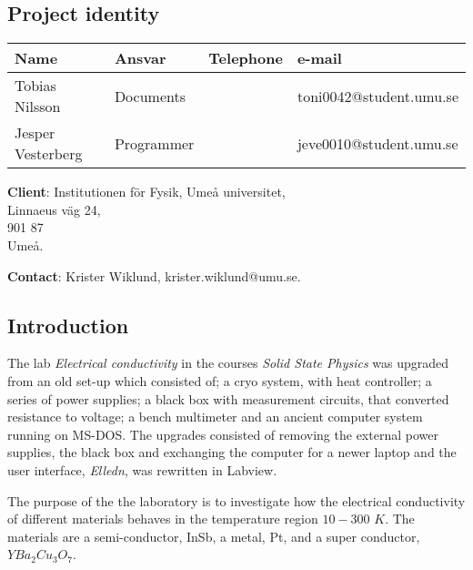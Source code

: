 \documentclass[a4paper,12pt]{article}
\begin{document}
\pagestyle{fancy}
\headheight 35pt 
\rhead{\small\today \\ }
\chead{\projektnamn}
\lhead{\organisation \\ }
\cfoot{\thepage}
\rfoot{\projektgrupp}
\begin{center}

\section*{\center Project identity}

\bigskip
\begin{tabular}{|p{35mm}|p{30mm}|p{20mm}|p{45mm}|}
\hline
\textbf{Name} & \textbf{Ansvar} & \textbf{Telephone} & \textbf{e-mail}\\
\hline
Tobias Nilsson & Documents &  & toni0042@student.umu.se\\
\hline
Jesper Vesterberg & Programmer &  & jeve0010@student.umu.se\\
\hline
\end{tabular}

\bigskip
\textbf{Client}: Institutionen för Fysik, Umeå universitet, \\
Linnaeus väg 24,\\
901 87\\
Umeå.

\textbf{Contact}: Krister Wiklund, krister.wiklund@umu.se.
\end{center}
\newpage

\tableofcontents
\newpage
{}

\subsection{Introduction}
The lab \emph{Electrical conductivity} in the courses \emph{Solid State Physics} was upgraded from an old set-up which consisted of; a cryo system, with heat controller; a series of power supplies; a black box with measurement circuits, that converted resistance to voltage; a bench multimeter and an ancient  computer system running on MS-DOS. The upgrades consisted of removing the external power supplies, the black box and exchanging the computer for a newer laptop and the user interface, \emph{Elledn}, was rewritten in Labview.

The purpose of the the laboratory is to investigate how the electrical conductivity of different materials behaves in the temperature region $10-300$ $K$. The materials are a semi-conductor, InSb, a metal, Pt, and a super conductor, $YBa_2Cu_3O_7$.
\end{document}

